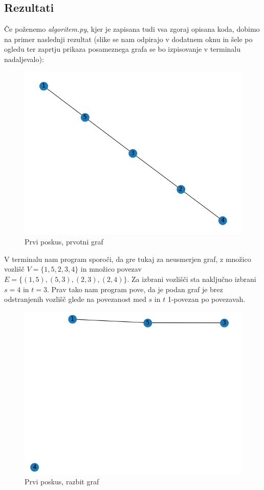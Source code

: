 \documentclass[a4paper,12pt]{article}
\theoremstyle{definition}
\begin{document}
\subsection{Rezultati}

Če poženemo \textit{algoritem.py}, kjer je zapisana tudi vsa zgoraj opisana koda,
dobimo na primer naslednji rezultat (slike se nam odpirajo v dodatnem oknu in šele po
ogledu ter zaprtju prikaza posameznega grafa se bo izpisovanje v terminalu nadaljevalo):

\begin{figure}[H]
	\caption{Prvi poskus, prvotni graf}
	\centering
	\includegraphics[scale=0.4]{slikovni_prikaz/Figure_1_0}
\end{figure}

V terminalu nam program sporoči, da gre tukaj za neusmerjen graf, 
z množico vozlišč $V = \{1, 5, 2, 3, 4\}$ in množico povezav $E = \{(1, 5), (5, 3), (2, 3), (2, 4)\}$.
Za izbrani vozlišči sta naključno izbrani $s = 4$ in $t = 3$. 
Prav tako nam program pove, da je podan graf je brez odstranjenih vozlišč
glede na povezanost med $s$ in $t$ 1-povezan po povezavah.

\begin{figure}[H]
	\caption{Prvi poskus, razbit graf}
	\centering
	\includegraphics[scale=0.4]{slikovni_prikaz/Figure_1_1}
\end{figure}
\end{document}
